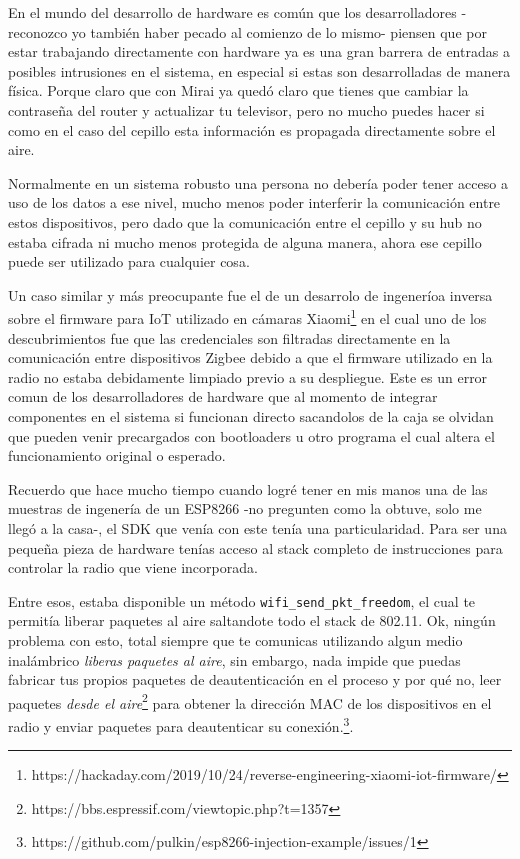 \documentclass[11pt]{utalcaDoc}
\begin{document}
En el mundo del desarrollo de hardware es común que los desarrolladores -reconozco yo también haber pecado al comienzo de lo mismo- piensen que por estar trabajando directamente con hardware ya es una gran barrera de entradas a posibles intrusiones en el sistema, en especial si estas son desarrolladas de manera física. Porque claro que con Mirai ya quedó claro que tienes que cambiar la contraseña del router y actualizar tu televisor, pero no mucho puedes hacer si como en el caso del cepillo esta información es propagada directamente sobre el aire.

Normalmente en un sistema robusto una persona no debería poder tener acceso a uso de los datos a ese nivel, mucho menos poder interferir la comunicación entre estos dispositivos, pero dado que la comunicación entre el cepillo y su hub no estaba cifrada  ni mucho menos protegida de alguna manera, ahora ese cepillo puede ser utilizado para cualquier cosa.

Un caso similar y más preocupante fue el de un desarrolo de ingeneríoa inversa sobre el firmware para IoT utilizado en cámaras Xiaomi\footnote{https://hackaday.com/2019/10/24/reverse-engineering-xiaomi-iot-firmware/} en el cual uno de los descubrimientos fue que las credenciales son filtradas directamente en la comunicación entre dispositivos Zigbee debido a que el firmware utilizado en la radio no estaba debidamente limpiado previo a su despliegue. Este es un error comun de los desarrolladores de hardware que al momento de integrar componentes en el sistema si funcionan directo sacandolos de la caja se olvidan que pueden venir precargados con bootloaders u otro programa el cual altera el funcionamiento original o esperado.

Recuerdo que hace mucho tiempo cuando logré tener en mis manos una de las muestras de ingenería de un ESP8266 -no pregunten como la obtuve, solo me llegó a la casa-, el SDK que venía con este tenía una particularidad. Para ser una pequeña pieza de hardware tenías acceso al stack completo de instrucciones para controlar la radio que viene incorporada.

Entre esos, estaba disponible un método \texttt{wifi\_send\_pkt\_freedom}, el cual te permitía liberar paquetes al aire saltandote todo el stack de 802.11. Ok, ningún problema con esto, total siempre que te comunicas utilizando algun medio inalámbrico \textit{liberas paquetes al aire}, sin embargo, nada impide que puedas fabricar tus propios paquetes de deautenticación en el proceso y por qué no, leer paquetes \textit{desde el aire}\footnote{https://bbs.espressif.com/viewtopic.php?t=1357} para obtener la dirección MAC de los dispositivos en el radio y enviar paquetes para deautenticar su conexión.\footnote{https://github.com/pulkin/esp8266-injection-example/issues/1}.
\end{document}
